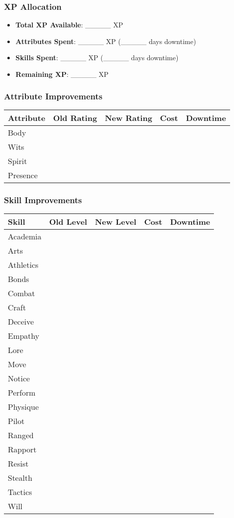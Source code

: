 \subsubsection{XP Allocation}
\begin{itemize}
    \item \textbf{Total XP Available}: \_\_\_\_\_ XP
    \item \textbf{Attributes Spent}: \_\_\_\_\_ XP (\_\_\_\_\_ days downtime)
    \item \textbf{Skills Spent}: \_\_\_\_\_ XP (\_\_\_\_\_ days downtime)
    \item \textbf{Remaining XP}: \_\_\_\_\_ XP
\end{itemize}

\subsubsection{Attribute Improvements}
\begin{tabular}{|p{3cm}|c|c|c|c|}
\hline
\textbf{Attribute} & \textbf{Old Rating} & \textbf{New Rating} & \textbf{Cost} & \textbf{Downtime} \\
\hline
Body & & & & \\
Wits & & & & \\
Spirit & & & & \\
Presence & & & & \\
\hline
\end{tabular}

\subsubsection{Skill Improvements}
\begin{tabular}{|p{4cm}|c|c|c|c|}
\hline
\textbf{Skill} & \textbf{Old Level} & \textbf{New Level} & \textbf{Cost} & \textbf{Downtime} \\
\hline
Academia & & & & \\
Arts & & & & \\
Athletics & & & & \\
Bonds & & & & \\
Combat & & & & \\
Craft & & & & \\
Deceive & & & & \\
Empathy & & & & \\
Lore & & & & \\
Move & & & & \\
Notice & & & & \\
Perform & & & & \\
Physique & & & & \\
Pilot & & & & \\
Ranged & & & & \\
Rapport & & & & \\
Resist & & & & \\
Stealth & & & & \\
Tactics & & & & \\
Will & & & & \\
\hline
\end{tabular}

